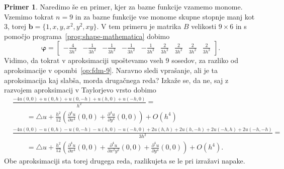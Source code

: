 \documentclass[a4paper,twoside]{article}
\theoremstyle{definition} %
\newtheorem{primer}[definicija]{Primer}
\theoremstyle{plain} %
\numberwithin{equation}{section}
\renewcommand{\b}{\boldsymbol}
\renewcommand{\phi}{\varphi}
\newcommand{\dpar}[2]{\ensuremath{\frac{\partial #1}{\partial #2}}}
\begin{document}
\begin{primer}
  Naredimo še en primer, kjer za bazne funkcije vzamemo monome. Vzemimo tokrat
  $n = 9$ in za bazne funkcije vse monome skupne stopnje manj kot 3, torej $\b b = \{1,
  x, y, x^2, y^2, xy\}$. V tem primeru je matrika $B$ velikosti $9\times 6$ in
  s pomočjo programa~\ref{prog:shape-mathematica} dobimo
  \[
    \b\phi =
    \begin{bmatrix}
-\frac{4}{3 h^2} & -\frac{1}{3 h^2} & -\frac{1}{3 h^2} & -\frac{1}{3 h^2} &
-\frac{1}{3 h^2} & \frac{2}{3 h^2} & \frac{2}{3 h^2} & \frac{2}{3 h^2} &
\frac{2}{3 h^2}
    \end{bmatrix}.
  \]
  Vidimo, da tokrat v aproksimaciji upoštevamo vseh 9 sosedov, za razliko od
  aproksimacije v opombi~\ref{op:fdm-9}. Naravno sledi vprašanje, ali je ta
  aproksimacija kaj slabša, morda drugačnega reda? Izkaže se, da ne, saj z
  razvojem aproksimacij v Taylorjevo vrsto dobimo
  \scriptsize
  \begin{align*}
    &\frac{-4 u(0, 0) + u(0, h) + u(0, -h) + u(h, 0) + u(-h, 0)}{h^2} = \\
    & \qquad = \triangle u + \frac{h^2}{12}\left(\dpar{^4u}{x^4}(0,0) +
  \dpar{^4u}{y^4}(0, 0)\right) + O(h^4) \\
    &\frac{-4 u(0, 0) - u(0, h) - u(0, -h) - u(h, 0) - u(-h, 0)
    + 2u(h, h) + 2u(h, -h) + 2u(-h, h) + 2u(-h, -h)}{3h^2} = \\
    & \qquad =
    \triangle u + \frac{h^2}{12}\left(\dpar{^4u}{x^4}(0,0) + \dpar{^4u}{x^2y^2}(0,0) +
    \dpar{^4u}{y^4}(0, 0)\right) + O(h^4).
  \end{align*}
  \normalsize
  Obe aproksimaciji sta torej drugega reda, razlikujeta se le pri izražavi
  napake.
\end{primer}
\end{document}
